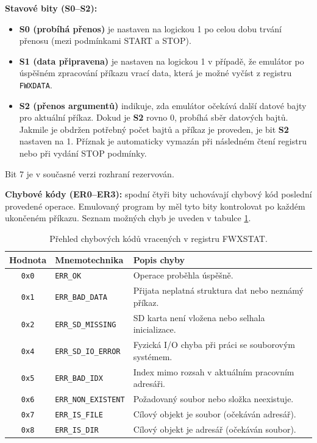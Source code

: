 \textbf{Stavové bity (S0--S2):}
\begin{itemize}
    \item \textbf{S0 (probíhá přenos)} je nastaven na logickou 1 po celou dobu trvání přenosu (mezi
        podmínkami START a STOP).
    \item \textbf{S1 (data připravena)} je nastaven na logickou 1 v případě, že emulátor po úspěšném
        zpracování příkazu vrací data, která je možné vyčíst z registru \texttt{FWXDATA}.
    \item \textbf{S2 (přenos argumentů)} indikuje, zda emulátor očekává další datové bajty pro
        aktuální příkaz. Dokud je \textbf{S2} rovno 0, probíhá sběr datových bajtů. Jakmile je
        obdržen potřebný počet bajtů a příkaz je proveden, je bit \textbf{S2} nastaven na 1. Příznak
        je automaticky vymazán při následném čtení registru nebo při vydání STOP podmínky.
\end{itemize}

Bit 7 je v současné verzi rozhraní rezervován.

\label{subsec:last_error_code}
\textbf{Chybové kódy (ER0--ER3):} spodní čtyři bity uchovávají chybový kód poslední provedené
operace. Emulovaný program by měl tyto bity kontrolovat po každém ukončeném příkazu. Seznam možných
chyb je uveden v tabulce \ref{tab:error_codes}.

\begin{table}[H]
    \centering
    \begin{tabular}{cll}
        \toprule
        \textbf{Hodnota} & \textbf{Mnemotechnika} & \textbf{Popis chyby} \\
        \midrule
        \texttt{0x0} & \texttt{ERR\_OK} & Operace proběhla úspěšně. \\
        \texttt{0x1} & \texttt{ERR\_BAD\_DATA} & Přijata neplatná struktura dat nebo neznámý příkaz. \\
        \texttt{0x2} & \texttt{ERR\_SD\_MISSING} & SD karta není vložena nebo selhala inicializace. \\
        \texttt{0x4} & \texttt{ERR\_SD\_IO\_ERROR} & Fyzická I/O chyba při práci se souborovým systémem. \\
        \texttt{0x5} & \texttt{ERR\_BAD\_IDX} & Index mimo rozsah v aktuálním pracovním adresáři. \\
        \texttt{0x6} & \texttt{ERR\_NON\_EXISTENT} & Požadovaný soubor nebo složka neexistuje. \\
        \texttt{0x7} & \texttt{ERR\_IS\_FILE} & Cílový objekt je soubor (očekáván adresář). \\
        \texttt{0x8} & \texttt{ERR\_IS\_DIR} & Cílový objekt je adresář (očekáván soubor). \\
        \bottomrule
    \end{tabular}
    \caption{Přehled chybových kódů vracených v registru FWXSTAT.}
    \label{tab:error_codes}
\end{table}

